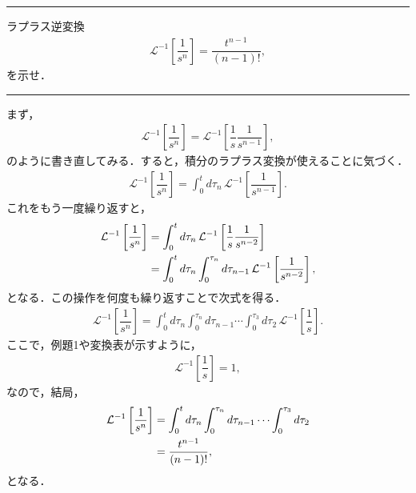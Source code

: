 %
\hrule
\reidai
ラプラス逆変換
\begin{align}
 \mathcal{L}^{-1}\left[\dfrac{1}{s^n}\right] = \dfrac{t^{n-1}}{(n-1)!}, 
\end{align}
を示せ．
\vspace*{.2cm}
\hrule
\vspace*{.2cm}
%
まず，
\begin{align}
 \mathcal{L}^{-1}\left[\dfrac{1}{s^n}\right] = \mathcal{L}^{-1}\left[\dfrac{1}{s}\dfrac{1}{s^{n-1}}\right], 
\end{align}
のように書き直してみる．すると，積分のラプラス変換が使えることに気づく．
\begin{align}
 \mathcal{L}^{-1}\left[\dfrac{1}{s^{n}}\right] = \int_{0}^{t}d\tau_{n}\,\mathcal{L}^{-1}\left[\dfrac{1}{s^{n-1}}\right]. 
\end{align}
これをもう一度繰り返すと，
\begin{align}
  \mathcal{L}^{-1}\left[\dfrac{1}{s^{n}}\right] 
  &= \int_{0}^{t}d\tau_{n}\,\mathcal{L}^{-1}\left[\dfrac{1}{s}\dfrac{1}{s^{n-2}}\right] \notag \\
  &= \int_{0}^{t}d\tau_{n}\int_{0}^{\tau_{n}}d\tau_{n-1}\,\mathcal{L}^{-1}\left[\dfrac{1}{s^{n-2}}\right],
\end{align}
となる．この操作を何度も繰り返すことで次式を得る．
\begin{align}
  \mathcal{L}^{-1}\left[\dfrac{1}{s^{n}}\right] = \int_{0}^{t}d\tau_{n}\int_{0}^{\tau_{n}}d\tau_{n-1}\cdots 
     \int_{0}^{\tau_{3}}d\tau_{2}\,\mathcal{L}^{-1}\left[\dfrac{1}{s}\right]. 
\end{align}
ここで，例題1や変換表が示すように，
\begin{align}
 \mathcal{L}^{-1}\left[\dfrac{1}{s}\right] = 1, 
\end{align}
なので，結局，
\begin{align}
  \mathcal{L}^{-1}\left[\dfrac{1}{s^{n}}\right] 
     &= \int_{0}^{t}d\tau_{n}\int_{0}^{\tau_{n}}d\tau_{n-1}\cdots 
     \int_{0}^{\tau_{3}}d\tau_{2} \notag \\
     &= \dfrac{t^{n-1}}{(n-1)!},
\end{align}
となる．
%
\newpage
%
